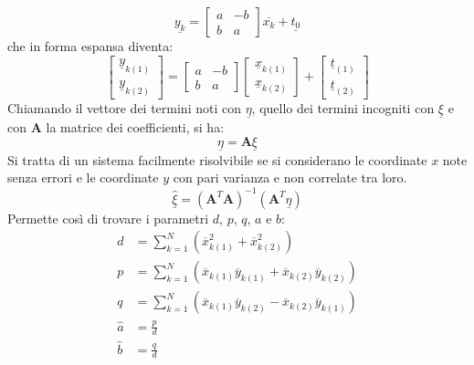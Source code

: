 \begin{equation}
\underline{y_{k}}=
\begin{bmatrix}
	{a} & {-b} \\ 
	{b} & {a}
\end{bmatrix} 
\overline{x_{k}}+\underline{t_{0}}
\end{equation}
che in forma espansa diventa:
\begin{equation}
	\begin{bmatrix}
		\underline{y}_{k(1)} \\ 
		\underline{y}_{k(2)}
	\end{bmatrix} 
	=
	\begin{bmatrix}
		{a} & {-b} \\ 
		{b} & {a}
	\end{bmatrix}
	\begin{bmatrix}
		\underline{x}_{k(1)} \\ 
		\underline{x}_{k(2)}
	\end{bmatrix}
	+
	\begin{bmatrix}
		\underline{t}_{(1)} \\ 
		\underline{t}_{(2)}
	\end{bmatrix}
\end{equation}
Chiamando il vettore dei termini noti con $\underline{\eta}$, quello dei termini incogniti con $\underline{\xi}$ e con $\mathbf{A}$ la matrice dei coefficienti, si ha:
\begin{equation}
	\underline{\eta}=\mathbf{A} \underline{\xi}
\end{equation}
Si tratta di un sistema facilmente risolvibile se si considerano le coordinate $x$ note senza errori e le coordinate $y$ con pari varianza e non correlate tra loro. 
\begin{equation}
	\hat{\underline{\xi}}=	
	\left(\mathbf{A}^T \mathbf{A}\right)^{-1}
	\left(\mathbf{A}^T \underline{\eta}\right)
\end{equation}
Permette così di trovare i parametri $d$, $p$, $q$, $a$ e $b$:
\begin{align} d &=\sum_{k=1}^{N}\left(\overline{x}_{k(1)}^{2}+\overline{x}_{k(2)}^{2}\right) \\ 
p &=\sum_{k=1}^{N}\left(\overline{x}_{k(1)} \overline{y}_{k(1)}+\overline{x}_{k(2)} \overline{y}_{k(2)}\right) \\ 
q &=\sum_{k=1}^{N}\left(\overline{x}_{k(1)} \overline{y}_{k(2)}-\overline{x}_{k(2)} \overline{y}_{k(1)}\right) \\
\hat{a} &= \frac{p}{d} \\
\hat{b} &= \frac{q}{d}
\end{align}
